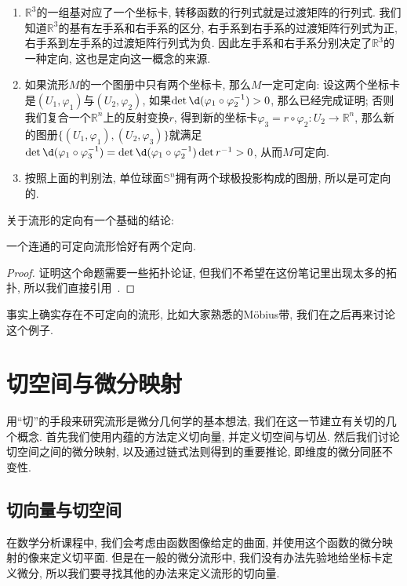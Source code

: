 \begin{eg}
    \begin{enumerate}[(1)]
        \item $\mathbb{R}^3$的一组基对应了一个坐标卡, 转移函数的行列式就是过渡矩阵的行列式.
        我们知道$\mathbb{R}^3$的基有左手系和右手系的区分, 右手系到右手系的过渡矩阵行列式为正, 右手系到左手系的过渡矩阵行列式为负.
        因此左手系和右手系分别决定了$\mathbb{R}^3$的一种定向, 这也是定向这一概念的来源.
        \item 如果流形$M$的一个图册中只有两个坐标卡, 那么$M$一定可定向:
        设这两个坐标卡是$(U_1,\varphi_1)$与$(U_2,\varphi_2)$, 如果$\det\d(\varphi_1\circ\varphi_2^{-1})>0$, 那么已经完成证明;
        否则我们复合一个$\mathbb{R}^n$上的反射变换$r$, 得到新的坐标卡$\varphi_3=r\circ\varphi_2:U_2\to\mathbb{R}^n$, 那么新的图册$\{(U_1,\varphi_1),(U_2,\varphi_3)\}$就满足$\det\d(\varphi_1\circ\varphi_3^{-1})=\det\d(\varphi_1\circ\varphi_2^{-1})\det{r^{-1}}>0$, 从而$M$可定向.
        \item 按照上面的判别法, 单位球面$\mathbb{S}^n$拥有两个球极投影构成的图册, 所以是可定向的.
    \end{enumerate}
\end{eg}

关于流形的定向有一个基础的结论:

\begin{prop}
    一个连通的可定向流形恰好有两个定向.
\end{prop}

\begin{proof}
    证明这个命题需要一些拓扑论证, 但我们不希望在这份笔记里出现太多的拓扑, 所以我们直接引用~\parencite[引理1.1.2]{Mei_Manifold}.
\end{proof}

事实上确实存在不可定向的流形, 比如大家熟悉的M\"{o}bius带, 我们在之后再来讨论这个例子.\label{sect_of_mani}

\section{切空间与微分映射}
用``切''的手段来研究流形是微分几何学的基本想法, 我们在这一节建立有关切的几个概念.
首先我们使用内蕴的方法定义切向量, 并定义切空间与切丛.
然后我们讨论切空间之间的微分映射, 以及通过链式法则得到的重要推论, 即维度的微分同胚不变性.

\subsection*{切向量与切空间}
在数学分析课程中, 我们会考虑由函数图像给定的曲面, 并使用这个函数的微分映射的像来定义切平面.
但是在一般的微分流形中, 我们没有办法先验地给坐标卡定义微分, 所以我们要寻找其他的办法来定义流形的切向量.

